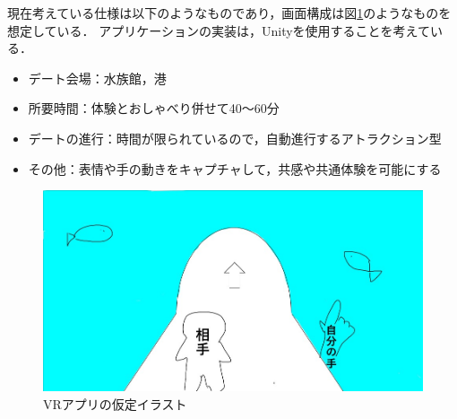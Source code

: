 \documentclass[12pt]{ltjsarticle}
\begin{document}
現在考えている仕様は以下のようなものであり，画面構成は図\ref{fig:イラスト}のようなものを想定している．
アプリケーションの実装は，Unityを使用することを考えている．

\begin{itemize}
\item デート会場：水族館，港
\item 所要時間：体験とおしゃべり併せて40〜60分
\item デートの進行：時間が限られているので，自動進行するアトラクション型
\item その他：表情や手の動きをキャプチャして，共感や共通体験を可能にする
\end{itemize}





\begin{figure}[h]
\begin{center}
 \includegraphics[width=150mm]{irasuto.jpg}
\end{center}
 \caption{VRアプリの仮定イラスト}
 \label{fig:イラスト}
\end{figure}
\end{document}
